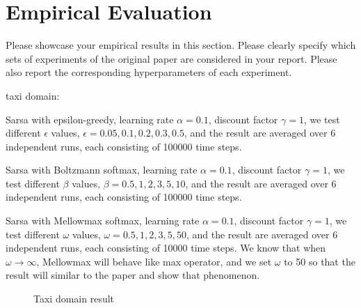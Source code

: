 \section{Empirical Evaluation}
\label{section:evaluation}
Please showcase your empirical results in this section. Please clearly specify which sets of experiments of the original paper are considered in your report. Please also report the corresponding hyperparameters of each experiment.

taxi domain:

Sarsa with epsilon-greedy, learning rate $\alpha = 0.1$, discount factor $\gamma = 1 $, we test different $\epsilon$ values, $\epsilon = 0.05, 0.1, 0.2, 0.3, 0.5$, and the result are averaged over 6 independent runs, each consisting of 100000 time steps.

Sarsa with Boltzmann softmax, learning rate $\alpha = 0.1$, discount factor $\gamma = 1 $, we test different $\beta$ values, $\beta = 0.5, 1, 2, 3, 5, 10$, and the result are averaged over 6 independent runs, each consisting of 100000 time steps.

Sarsa with Mellowmax softmax, learning rate $\alpha = 0.1$, discount factor $\gamma = 1 $, we test different $\omega$ values, $\omega = 0.5, 1, 2, 3, 5, 50$, and the result are averaged over 6 independent runs, each consisting of 10000 time steps. We know that when $\omega \to \infty$, Mellowmax will behave like max operator, and we set $\omega$ to 50 so that the result will similar to the paper and show that phenomenon.

\begin{figure}[H]
\centering  
{}
\caption{Taxi domain result}
\end{figure}